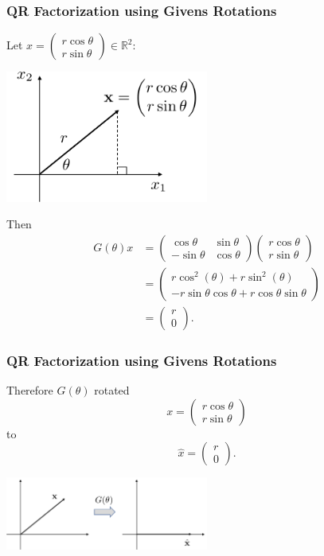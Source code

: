 \documentclass{beamer}
\begin{document}
\begin{frame}\frametitle{QR Factorization using Givens Rotations}
	Let $x = \begin{pmatrix} r\cos\theta \\ r\sin\theta\end{pmatrix} \in \mathbb{R}^2$:
	\begin{center}
	\includegraphics[width=0.5\textwidth]{figures/chap5_givens_1}
	\end{center}
	Then
	\begin{align*} 
		G(\theta)x 
		&= 
			\begin{pmatrix}
	    		\cos\theta & \sin\theta\\
	  			-\sin\theta & \cos\theta
	  		\end{pmatrix}
	  		\begin{pmatrix}
	    		r\cos\theta\\
	  			r\sin\theta
	  		\end{pmatrix} \\
	  	&=
			\begin{pmatrix}
	    		r\cos^2(\theta) + r\sin^2(\theta)\\
	  			-r\sin\theta\cos\theta + r\cos\theta\sin\theta
	  		\end{pmatrix} \\
		&= 
			\begin{pmatrix} r \\ 0 \end{pmatrix}.
	\end{align*}	
\end{frame}

\begin{frame}\frametitle{QR Factorization using Givens Rotations}
	Therefore $G(\theta)$ rotated 
	\[
		x = \begin{pmatrix} 
				r\cos\theta \\ 
				r\sin\theta
 			\end{pmatrix}
 	\]
 	to 
 	\[
 		\hat{x} = \begin{pmatrix} r \\ 0 \end{pmatrix}.
 	\]

	\begin{center}
		\includegraphics[width=0.5\textwidth]{figures/chap5_givens_2}
	\end{center}
\end{frame}
\end{document}
